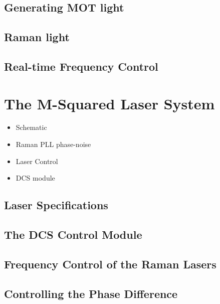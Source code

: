 \subsection{Generating MOT light}
\subsection{Raman light}
\subsection{Real-time Frequency Control}
\section{The M-Squared Laser System}\label{sec:setup_msquared}
\begin{itemize}
    \item Schematic
    \item Raman PLL phase-noise
    \item Laser Control
    \item DCS module
\end{itemize}
\subsection{Laser Specifications}
\subsection{The DCS Control Module}
\subsection{Frequency Control of the Raman Lasers}
\subsection{Controlling the Phase Difference}
